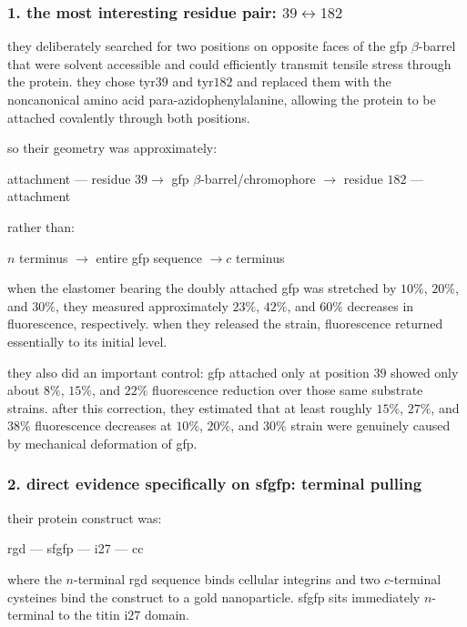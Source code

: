 \documentclass{article}
\begin{document}
\subsubsection*{1. the most interesting residue pair: \(39 \leftrightarrow 182\)}

they deliberately searched for two positions on opposite faces of the gfp \(\beta\)-barrel that were solvent accessible and could efficiently transmit tensile stress through the protein. they chose tyr\(39\) and tyr\(182\) and replaced them with the noncanonical amino acid para-azidophenylalanine, allowing the protein to be attached covalently through both positions. \href{https://pubs.rsc.org/en/content/articlehtml/2015/cc/c4cc07486f}{\textbullet}

so their geometry was approximately:

attachment --- residue \(39 \rightarrow\) gfp \(\beta\)-barrel/chromophore \(\rightarrow\) residue \(182\) --- attachment

rather than:

\(n\) terminus \(\rightarrow\) entire gfp sequence \(\rightarrow c\) terminus

when the elastomer bearing the doubly attached gfp was stretched by \(10\%\), \(20\%\), and \(30\%\), they measured approximately \(23\%\), \(42\%\), and \(60\%\) decreases in fluorescence, respectively. when they released the strain, fluorescence returned essentially to its initial level. \href{https://pubs.rsc.org/en/content/articlehtml/2015/cc/c4cc07486f}{\textbullet}

they also did an important control: gfp attached only at position \(39\) showed only about \(8\%\), \(15\%\), and \(22\%\) fluorescence reduction over those same substrate strains. after this correction, they estimated that at least roughly \(15\%\), \(27\%\), and \(38\%\) fluorescence decreases at \(10\%\), \(20\%\), and \(30\%\) strain were genuinely caused by mechanical deformation of gfp. \href{https://pubs.rsc.org/en/content/articlehtml/2015/cc/c4cc07486f}{\textbullet}

\subsubsection*{2. direct evidence specifically on sfgfp: terminal pulling}

their protein construct was:

rgd --- sfgfp --- i27 --- cc

where the \(n\)-terminal rgd sequence binds cellular integrins and two \(c\)-terminal cysteines bind the construct to a gold nanoparticle. sfgfp sits immediately \(n\)-terminal to the titin i\(27\) domain. \href{https://pmc.ncbi.nlm.nih.gov/articles/pmc5592801/}{\textbullet}
\end{document}

